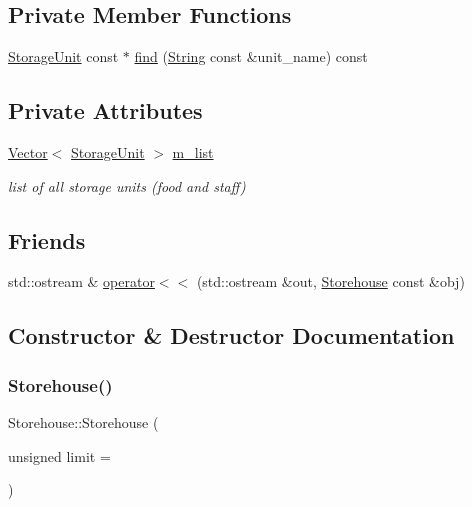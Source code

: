 \subsection*{Private Member Functions}
\begin{DoxyCompactItemize}
\item 
\hyperlink{classStorageUnit}{Storage\+Unit} const  $\ast$ \hyperlink{classStorehouse_aca171c012833fcee541b5c36833034be}{find} (\hyperlink{classString}{String} const \&unit\+\_\+name) const
\end{DoxyCompactItemize}
\subsection*{Private Attributes}
\begin{DoxyCompactItemize}
\item 
\hyperlink{classVector}{Vector}$<$ \hyperlink{classStorageUnit}{Storage\+Unit} $>$ \hyperlink{classStorehouse_aa5d81c208f66eb440d807aa9a769a2fd}{m\+\_\+list}
\begin{DoxyCompactList}\small\item\em list of all storage units (food and staff) \end{DoxyCompactList}\end{DoxyCompactItemize}
\subsection*{Friends}
\begin{DoxyCompactItemize}
\item 
std\+::ostream \& \hyperlink{classStorehouse_a2849e8095f3745a8766e4d3f7f0fba1f}{operator$<$$<$} (std\+::ostream \&out, \hyperlink{classStorehouse}{Storehouse} const \&obj)
\end{DoxyCompactItemize}


\subsection{Constructor \& Destructor Documentation}
\mbox{\label{classStorehouse_ac669678b559e7c33b980e80fc0d80d05}} 
\subsubsection{\texorpdfstring{Storehouse()}{Storehouse()}}
{\footnotesize\ttfamily Storehouse\+::\+Storehouse (\begin{DoxyParamCaption}\item[{unsigned}]{limit = {} }\end{DoxyParamCaption})}



